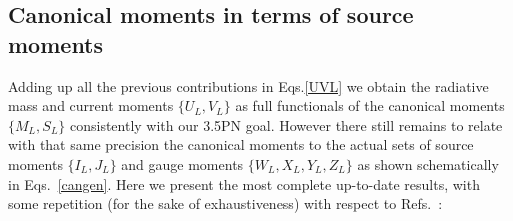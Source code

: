\documentclass[prd,preprint,superscriptaddress,tightenlines,nofootinbib,
  eqsecnum,showpacs]{revtex4}
\begin{document}
\subsection{Canonical moments in terms of source moments}
\label{sec:cansource}

Adding up all the previous contributions in Eqs.\eqref{UVL} we obtain
the radiative mass and current moments $\{U_L, V_L\}$ as full
functionals of the canonical moments $\{M_L, S_L\}$ consistently with
our 3.5PN goal. However there still remains to relate with that same
precision the canonical moments to the actual sets of source moments
$\{I_L, J_L\}$ and gauge moments $\{W_L, X_L, Y_L, Z_L\}$ as shown
schematically in Eqs.~\eqref{cangen}. Here we present the most
complete up-to-date results, with some repetition (for the sake of
exhaustiveness) with respect to Refs.~\cite{BFIS08, FMBI12}:
%
\end{document}
